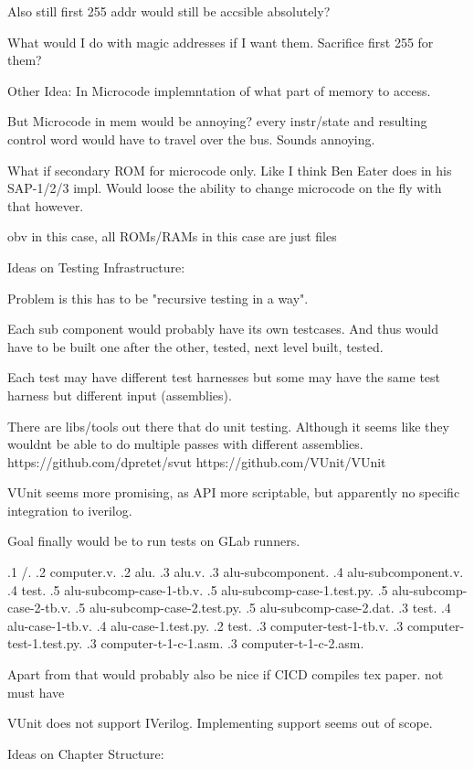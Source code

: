 Also still first 255 addr would still be accsible absolutely?

What would I do with magic addresses if I want them. Sacrifice first 255 for them?

Other Idea: In Microcode implemntation of what part of memory to access. 

But Microcode in mem would be annoying? every instr/state and resulting control word would have to travel over the bus. Sounds annoying. 

What if secondary ROM for microcode only. Like I think Ben Eater does in his SAP-1/2/3 impl.
Would loose the ability to change microcode on the fly with that however. 

obv in this case, all ROMs/RAMs in this case are just files


Ideas on Testing Infrastructure:

Problem is this has to be "recursive testing in a way". 

Each sub component would probably have its own testcases. And thus would have to be built one after the other, tested, next level built, tested. 

Each test may have different test harnesses but some may have the same test harness but different input (assemblies). 


There are libs/tools out there that do unit testing. Although it seems like they wouldnt be able to do multiple passes with different assemblies. https://github.com/dpretet/svut https://github.com/VUnit/VUnit

VUnit seems more promising, as API more scriptable, but apparently no specific integration to iverilog.

Goal finally would be to run tests on GLab runners. 


.1 /.
.2 computer.v.
.2 alu. 
.3 alu.v. 
.3 alu-subcomponent. 
.4 alu-subcomponent.v. 
.4 test. 
.5 alu-subcomp-case-1-tb.v.
.5 alu-subcomp-case-1.test.py.
.5 alu-subcomp-case-2-tb.v.
.5 alu-subcomp-case-2.test.py.
.5 alu-subcomp-case-2.dat.
.3 test.
.4 alu-case-1-tb.v.
.4 alu-case-1.test.py.
.2 test.
.3 computer-test-1-tb.v.
.3 computer-test-1.test.py.
.3 computer-t-1-c-1.asm.
.3 computer-t-1-c-2.asm.

Apart from that would probably also be nice if CICD compiles tex paper. not must have

VUnit does not support IVerilog. Implementing support seems out of scope. 




Ideas on Chapter Structure:


